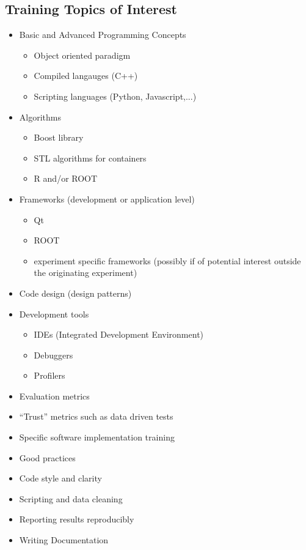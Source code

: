 \documentclass[12pt,a4paper]{article}
\begin{document}
\newpage
\begin{appendices}

\sloppy
\raggedright

\hypertarget{appendix-a---training-topics-of-interest}{%
\section{Training Topics of Interest}\label{appendix-a---training-topics-of-interest}}

\begin{itemize}
   \item Basic and Advanced Programming Concepts
   \begin{itemize}
      \item Object oriented paradigm
      \item Compiled langauges (C++)
      \item Scripting languages (Python, Javascript,...)
   \end{itemize}
   \item Algorithms 
   \begin{itemize}
      \item Boost library
      \item STL algorithms for containers
      \item R and/or ROOT
   \end{itemize}
   \item Frameworks (development or application level)
   \begin{itemize}
      \item Qt
      \item ROOT
      \item experiment specific frameworks (possibly if of potential interest outside the originating experiment)
   \end{itemize}
   \item Code design (design patterns)
   \item Development tools
   \begin{itemize}
      \item IDEs (Integrated Development Environment)
      \item Debuggers
      \item Profilers
   \end{itemize}
   \item Evaluation metrics
   \item “Trust” metrics such as data driven tests
   \item Specific software implementation training
   \item Good practices 
   \item Code style and clarity
   \item Scripting and data cleaning
   \item Reporting results reproducibly
   \item Writing Documentation
\end{itemize}



\end{appendices}
\end{document}
